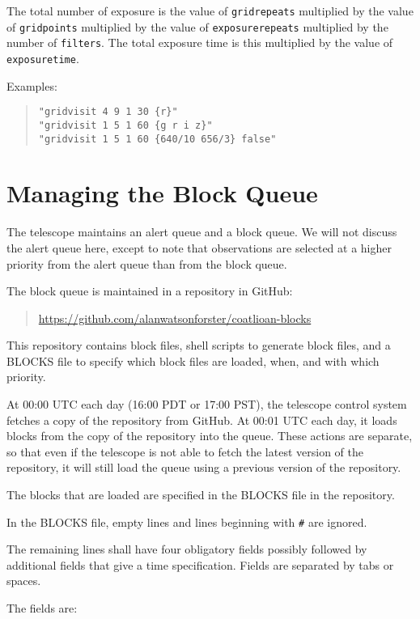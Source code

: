 The total number of exposure is the value of \verb|gridrepeats| multiplied by the value of \verb|gridpoints| multiplied by the value of \verb|exposurerepeats| multiplied by the number of \verb|filters|. The total exposure time is this multiplied by the value of \verb|exposuretime|.

Examples:
\begin{quote}
\begin{verbatim}
"gridvisit 4 9 1 30 {r}"
"gridvisit 1 5 1 60 {g r i z}"
"gridvisit 1 5 1 60 {640/10 656/3} false"
\end{verbatim}
\end{quote}

\section{Managing the Block Queue}

The telescope maintains an alert queue and a block queue. We will not discuss the alert queue here, except to note that observations are selected at a higher priority from the alert queue than from the block queue.

The block queue is maintained in a repository in GitHub:
\begin{quote}
\ifcoatlioan
\url{https://github.com/alanwatsonforster/coatlioan-blocks}
\fi    
\end{quote}
This repository contains block files, shell scripts to generate block files, and a BLOCKS file to specify which block files are loaded, when, and with which priority.

At 00:00 UTC each day (16:00 PDT or 17:00 PST), the telescope control system fetches a copy of the repository from GitHub. At 00:01 UTC each day, it loads blocks from the copy of the repository into the queue. These actions are separate, so that even if the telescope is not able to fetch the latest version of the repository, it will still load the queue using a previous version of the repository.

The blocks that are loaded are specified in the BLOCKS file in the repository. 

In the BLOCKS file, empty lines and lines beginning with \verb|#| are ignored.

The remaining lines shall have four obligatory fields possibly followed by additional fields that give a time specification. Fields are separated by tabs or spaces.

The fields are:

